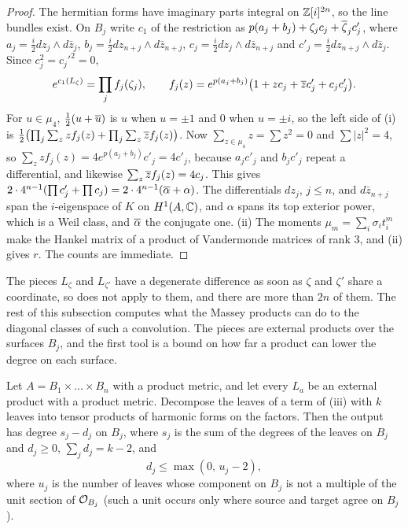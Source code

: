 \begin{proof}
The hermitian forms have imaginary parts integral on $\mathbb{Z}[i]^{2n}$, so the
line bundles exist. On $B_{j}$ write $c_{1}$ of the restriction as
$p(a_{j}+b_{j})+\zeta_{j}c_{j}+\overline{\zeta}_{j}c'_{j}$, where
$a_{j}=\tfrac i2dz_{j}\wedge d\bar z_{j}$,
$b_{j}=\tfrac i2dz_{n+j}\wedge d\bar z_{n+j}$,
$c_{j}=\tfrac i2dz_{j}\wedge d\bar z_{n+j}$ and
$c'_{j}=\tfrac i2dz_{n+j}\wedge d\bar z_{j}$. Since $c_{j}^{2}=c_{j}'^{2}=0$,
\[
  e^{c_{1}(L_{\zeta})}=\prod_{j}f_{j}(\zeta_{j}),\qquad
  f_{j}(z)=e^{p(a_{j}+b_{j})}\bigl(1+zc_{j}+\overline{z}c'_{j}+c_{j}c'_{j}\bigr).
\]
For
$u\in\mu_{4}$, $\tfrac12(u+\overline{u})$ is $u$ when $u=\pm1$ and $0$ when
$u=\pm i$, so the left side of (i) is
$\tfrac12\bigl(\prod_{j}\sum_{z}zf_{j}(z)+\prod_{j}\sum_{z}\overline{z}f_{j}(z)\bigr)$.
Now $\sum_{z\in\mu_{4}}z=\sum z^{2}=0$ and $\sum|z|^{2}=4$, so
$\sum_{z}zf_{j}(z)=4e^{p(a_{j}+b_{j})}c'_{j}=4c'_{j}$, because $a_{j}c'_{j}$
and $b_{j}c'_{j}$ repeat a differential, and likewise
$\sum_{z}\overline{z}f_{j}(z)=4c_{j}$. This gives
$2\cdot4^{n-1}(\prod c'_{j}+\prod c_{j})=2\cdot4^{n-1}(\overline{\alpha}+\alpha)$.
The differentials $dz_{j}$, $j\le n$, and $d\bar z_{n+j}$ span the
$i$-eigenspace of $K$ on $H^{1}(A,\mathbb{C})$, and $\alpha$ spans its top exterior
power, which is a Weil class, and $\overline{\alpha}$ the conjugate one. (ii) The
moments $\mu_{m}=\sum_{i}\sigma_{i}t_{i}^{m}$ make the Hankel matrix of
 a product of Vandermonde matrices of rank $3$, and
(ii) gives $r$. The counts are immediate.
\end{proof}

The pieces $L_{\zeta}$ and $L_{\zeta'}$ have a degenerate difference as soon
as $\zeta$ and $\zeta'$ share a coordinate, so  does not
apply to them, and there are more than $2n$ of them. The rest of this
subsection computes what the Massey products can do to the diagonal classes
of such a convolution. The pieces are external products over the surfaces
$B_{j}$, and the first tool is a bound on how far a product can lower the
degree on each surface.

\begin{lemma}\label{lem:degreedrop}
Let $A=B_{1}\times\dots\times B_{n}$ with a product metric, and let every
$L_{a}$ be an external product with a product metric. Decompose the leaves
of a term of (iii) with $k$ leaves into tensor
products of harmonic forms on the factors. Then the output has degree
$s_{j}-d_{j}$ on $B_{j}$, where $s_{j}$ is the sum of the degrees of the
leaves on $B_{j}$ and $d_{j}\ge0$, $\sum_{j}d_{j}=k-2$, and
\[
  d_{j}\le\max(0,\,u_{j}-2),
\]
where $u_{j}$ is the number of leaves whose component on $B_{j}$ is not a
multiple of the unit section of $\mathcal{O}_{B_{j}}$ (such a unit occurs only where
source and target agree on $B_{j}$).
\end{lemma}


